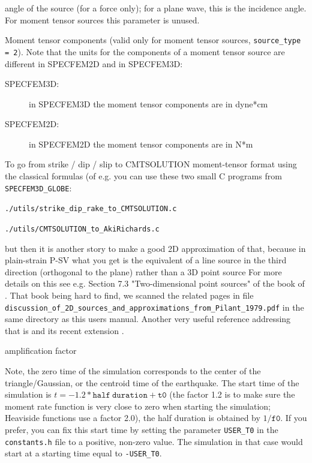 \documentclass[oneside,english,onecolumn,letterpaper]{book}
\begin{document}
\begin{description}[font=\ttfamily]
\item[anglesource] angle of the source (for a force only); for a plane wave, this is the incidence angle. For moment tensor sources this parameter is unused.

\item[Mxx,Mzz,Mxz] Moment tensor components (valid only for moment tensor sources, \texttt{source\_type = 2}).
Note that the units for the components of a moment tensor source are different in SPECFEM2D and in SPECFEM3D:
%
\begin{description}
\item[SPECFEM3D:] in SPECFEM3D the moment tensor components are in dyne*cm
\item[SPECFEM2D:] in SPECFEM2D the moment tensor components are in N*m
\end{description}

To go from strike / dip / slip to CMTSOLUTION moment-tensor format using the classical formulas (of e.g. \cite{AkRi80} you can use these two small C programs from \texttt{SPECFEM3D\_GLOBE}:

\texttt{./utils/strike\_dip\_rake\_to\_CMTSOLUTION.c}

\texttt{./utils/CMTSOLUTION\_to\_AkiRichards.c}

but then it is another story to make a good 2D approximation of that, because in plain-strain P-SV what you get is the equivalent of a line source in the third direction (orthogonal to the plane) rather than a 3D point source
For more details on this see e.g. Section 7.3 "Two-dimensional point sources" of the book of \cite{Pil79}. That book being hard to find, we scanned the related pages in file\\
\texttt{discussion\_of\_2D\_sources\_and\_approximations\_from\_Pilant\_1979.pdf} in the same directory as this users manual.
Another very useful reference addressing that is \cite{HeVi88} and its recent extension \citep{LiHeClSu14}.

\item[factor] amplification factor

\end{description}

Note, the zero time of the simulation corresponds to the center of the triangle/Gaussian,
or the centroid time of the earthquake. The start time of the simulation
is $t=-1.2*\mathtt{half~duration} + \mathtt{t0}$ (the factor 1.2 is to make sure the moment
rate function is very close to zero when starting the simulation; Heaviside functions use a factor 2.0),
the half duration is obtained by $1/\mathtt{f0}$.
If you prefer, you can fix this start time by setting the parameter \texttt{USER\_T0} in the \texttt{constants.h} file
to a positive, non-zero value. The simulation in that case would start at a starting time equal to \texttt{-USER\_T0}.
\end{document}
